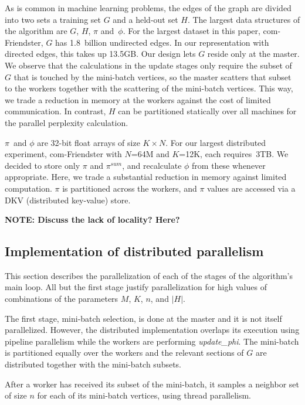 As is common in machine learning problems, the edges of the graph are divided
into two sets a training set $G$ and a held-out set $H$.
The largest data structures of the algorithm are $G$, $H$, $\pi$ and~$\phi$.
For the largest dataset in this paper, com-Friendster, $G$ has 1.8~billion
undirected edges. In our representation with directed edges, this takes
up 13.5GB. Our design lets $G$ reside only at the master. We observe that
the calculations in the update stages only require the subset of $G$ that
is touched by the mini-batch vertices, so the master scatters that subset to
the workers together with the scattering of the mini-batch vertices. This way,
we trade a reduction in memory at the workers against the cost of limited
communication. In contrast, $H$ can be partitioned statically over all
machines for the parallel perplexity calculation.

$\pi$~and $\phi$ are 32-bit float arrays of size $K \times N$. For our
largest distributed experiment, com-Friendster with $N$=64M and $K$=12K, each
requires~3TB. We decided to store only $\pi$ and $\pi^{sum}$, and recalculate
$\phi$ from these whenever appropriate. Here, we trade a substantial reduction
in memory against limited computation. $\pi$ is partitioned across the workers,
and $\pi$ values are accessed via a DKV (distributed key-value) store.


{\Large\bf NOTE: Discuss the lack of locality? Here?}


\subsection{Implementation of distributed parallelism}

This section describes the parallelization of each of the stages of the
algorithm's main loop. All but the first stage justify parallelization for
high values of combinations of the  parameters $M$, $K$, $n$, and $|H|$.

The first stage, mini-batch selection, is done at the master and it is
not itself parallelized. However, the distributed implementation overlaps
its execution using pipeline parallelism while the workers are
performing \textit{update\_phi}. The mini-batch is partitioned equally over
the workers and the relevant sections of $G$ are distributed together with the
mini-batch subsets.

After a worker has received its subset of the mini-batch, it samples a neighbor
set of size $n$ for each of its mini-batch vertices, using thread parallelism.

